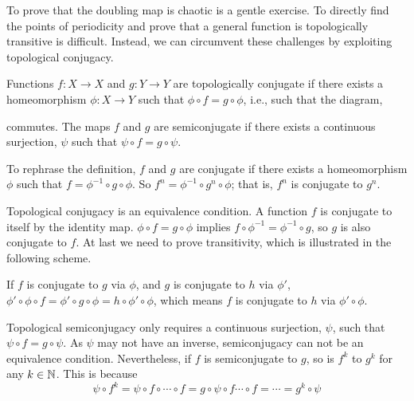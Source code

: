 To prove that the doubling map is chaotic is a gentle exercise. 
To directly find the points of periodicity and prove that a general function is topologically transitive is difficult.
Instead, we can circumvent these challenges by exploiting topological conjugacy.

\begin{defn}
Functions $f: X \rightarrow X$ and $g:  Y \rightarrow Y$ are topologically conjugate if there exists a homeomorphism $\phi: X \rightarrow Y$ such that 
$\phi \circ f = g \circ \phi$,
i.e., such that the diagram,
\begin{center}
\end{center}
commutes. The maps $f$ and $g$ are semiconjugate if there exists a continuous surjection, $\psi$ such that $\psi \circ f = g \circ \psi$.
\end{defn}


To rephrase the definition, $f $ and $g$ are conjugate if there exists a homeomorphism $\phi$ such that $f = \phi^{-1} \circ g \circ \phi$.
So $f^{n} = \phi^{-1} \circ g^{n} \circ \phi$; that is, $f^n$ is conjugate to $g^n$.

Topological conjugacy is an equivalence condition. 
A function $f$ is conjugate to itself by the identity map. 
$\phi \circ f = g \circ \phi$ implies $f \circ \phi^{-1} = \phi^{-1} \circ g$, so $g$ is also conjugate to $f$.
At last we need to prove transitivity, which is illustrated in the following scheme.
\begin{center}
\end{center}
If $f$  is conjugate to $g$ via $\phi$, and $g$ is conjugate to $h$ via $\phi'$, $\phi' \circ \phi \circ f = \phi' \circ g \circ \phi = h \circ \phi' \circ \phi $, which means $f$ is conjugate to $h$ via $\phi' \circ \phi$. 



Topological semiconjugacy only requires a continuous surjection, $\psi$, such that $\psi \circ f = g \circ \psi$. 
As $\psi$ may not have an inverse, semiconjugacy can not be an equivalence condition.
Nevertheless, if $f$ is semiconjugate to $g$, so is $f^{k}$ to $g^{k}$ for any $k \in \mathbb{N}$. 
This is because 
$$
	\psi \circ f ^k = \psi \circ f\circ \cdots \circ f = g \circ \psi \circ f \cdots \circ f = \cdots = g^k \circ \psi
$$

